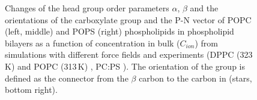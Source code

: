 \documentclass[12pt,a4paper,twoside,openright]{report}
\begin{document}
\begin{figure}[tb]
  \caption{ 
    Changes of the head group order parameters $\alpha$, $\beta$ and the orientations of the carboxylate group and the P-N vector  
    of POPC (left, middle) and POPS (right) phospholipids in phospholipid bilayers as a function of  concentration 
    in bulk ($C_{ion}$) from simulations with different force fields and experiments 
    (DPPC (323\,K) \citep{akutsu81} and POPC (313\,K) \citep{altenbach84}, PC:PS \citep{roux90}).  
    The orientation of the  group is defined as 
    the connector from the $\beta$ carbon to the carbon in  (stars, bottom right). 
  } 
\end{figure} 
\end{document}
